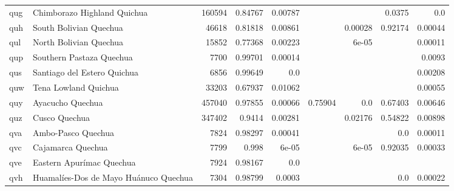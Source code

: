 \documentclass[11pt]{article}
\begin{document}
\begin{table*}[h]
{\begin{tabular}{llrrrrrrr}
qug         & Chimborazo Highland Quichua         & 160594         & 0.84767         & 0.00787         &          &          & 0.0375         & 0.0         \\

quh         & South Bolivian Quechua         & 46618         & 0.81818         & 0.00861         &          & 0.00028         & 0.92174         & 0.00044         \\

qul         & North Bolivian Quechua         & 15852         & 0.77368         & 0.00223         &          & 6e-05         &          & 0.00011         \\

qup         & Southern Pastaza Quechua         & 7700         & 0.99701         & 0.00014         &          &          &          & 0.0093         \\

qus         & Santiago del Estero Quichua         & 6856         & 0.99649         & 0.0         &          &          &          & 0.00208         \\

quw         & Tena Lowland Quichua         & 33203         & 0.67937         & 0.01062         &          &          &          & 0.00055         \\

quy         & Ayacucho Quechua         & 457040         & 0.97855         & 0.00066         & 0.75904         & 0.0         & 0.67403         & 0.00646         \\

quz         & Cusco Quechua         & 347402         & 0.9414         & 0.00281         &          & 0.02176         & 0.54822         & 0.00898         \\

qva         & Ambo-Pasco Quechua         & 7824         & 0.98297         & 0.00041         &          &          & 0.0         & 0.00011         \\

qvc         & Cajamarca Quechua         & 7799         & 0.998         & 6e-05         &          & 6e-05         & 0.92035         & 0.00033         \\

qve         & Eastern Apurímac Quechua         & 7924         & 0.98167         & 0.0         &          &          &          &          \\

qvh         & Huamalíes-Dos de Mayo Huánuco Quechua         & 7304         & 0.98799         & 0.0003         &          &          & 0.0         & 0.00022         \\


\end{tabular}}
\end{table*}
\end{document}
